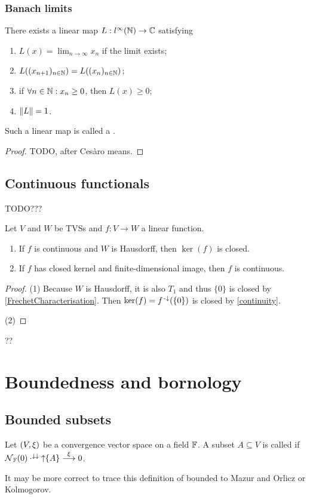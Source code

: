 \subsubsection{Banach limits}
\begin{proposition}
There exists a linear map $L:l^\infty(\mathbb{N}) \to \mathbb{C}$ satisfying
\begin{enumerate}
\item $\displaystyle L(x) = \lim_{n\to \infty}x_n$ if the limit exists;
\item $L((x_{n+1})_{n\in\mathbb{N}}) = L((x_n)_{n\in\mathbb{N}})$;
\item if $\forall n\in\mathbb{N}:x_n\geq 0$, then $L(x) \geq 0$;
\item $\lVert L\rVert = 1$.
\end{enumerate}
Such a linear map is called a .
\end{proposition}
\begin{proof}
TODO, after Cesàro means.
\end{proof}

\subsection{Continuous functionals}

TODO???
\begin{proposition}
Let $V$ and $W$ be TVSs and $f: V\to W$ a linear function.
\begin{enumerate}
\item If $f$ is continuous and $W$ is Hausdorff, then $\ker(f)$ is closed.
\item If $f$ has closed kernel and finite-dimensional image, then $f$ is continuous.
\end{enumerate}
\end{proposition}
\begin{proof}
(1) Because $W$ is Hausdorff, it is also $T_1$ and thus $\{0\}$ is closed by \ref{FrechetCharacterisation}. Then $\ker(f) = f^{{\text{\hspace{0.15em}-}\downarrow}}(\{0\})$ is closed by \ref{continuity}.

(2) 
\end{proof}
??

\section{Boundedness and bornology}
\subsection{Bounded subsets}
\begin{definition}
Let $\left( V,\xi \right)$ be a convergence vector space on a field $\mathbb{F}$. A subset $A\subseteq V$ is called  if $\operatorname{\mathcal{N}}_{\mathbb{F}}(0) \cdot^{\downarrow\downarrow} \operatorname{\uparrow}\{A\} \overset{\xi}{\longrightarrow} 0$.
\end{definition}
It may be more correct to trace this definition of bounded to Mazur and Orlicz or Kolmogorov.


